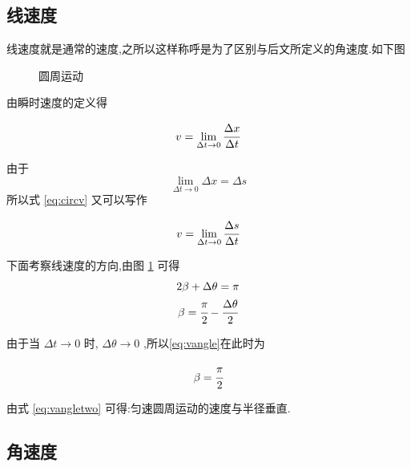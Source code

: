 \subsection{线速度}
线速度就是通常的速度,之所以这样称呼是为了区别与后文所定义的角速度.如下图

\begin{figure}[H]
  \centering
  \caption{圆周运动}
  \label{fig:circle}
\end{figure}

由瞬时速度的定义得

\begin{equation}
  v=\lim_{\Delta t \to 0} \cfrac{\Delta x}{\Delta t}
  \label{eq:circv}
\end{equation}

由于
$$\lim_{\Delta t \to 0} \Delta x=\Delta s$$
所以式 \eqref{eq:circv} 又可以写作

\begin{equation}
  v=\lim_{\Delta t \to 0} \cfrac{\Delta s}{\Delta t}
  \label{eq:circvs}
\end{equation}

下面考察线速度的方向,由图 \ref{fig:circle} 可得
\begin{gather}
  2\beta +\Delta \theta =\pi \notag\\
  \beta =\cfrac{\pi}{2}-\cfrac{\Delta \theta}{2}
  \label{eq:vangle}
\end{gather}

由于当 $\Delta t \to 0$ 时, $\Delta \theta \to 0$ ,所以\eqref{eq:vangle}在此时为

\begin{equation}
  \beta =\cfrac{\pi}{2}
  \label{eq:vangletwo}
\end{equation}

由式 \eqref{eq:vangletwo} 可得:匀速圆周运动的速度与半径垂直.

\subsection{角速度}

